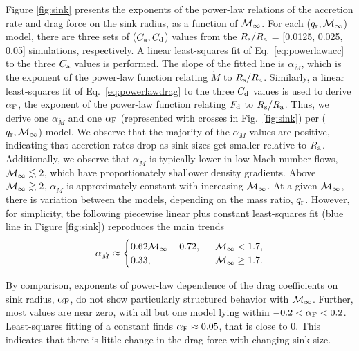 Figure \ref{fig:sink} presents the exponents of the power-law relations of the accretion rate and drag force on the sink radius, as a function of ${\cal M}_{\infty}$.  For each ($q_{\rm r}, \cal M_\infty$) model, there are three sets of ($C_{\rm a}, C_{\rm d}$) values from the $R_{\rm s}/R_{\rm a}$ = [0.0125, 0.025, 0.05] simulations, respectively. A linear least-squares fit of Eq.~\ref{eq:powerlawacc} to the three $C_{\rm a}$ values is performed. The slope of the fitted line is $\alpha_{\dot M}$, which is the exponent of the power-law function relating $\dot M$ to $R_{\rm s}/R_{\rm a}$. Similarly, a linear least-squares fit of Eq.~\ref{eq:powerlawdrag} to the three $C_{\rm d}$ values is used to derive $\alpha_{\rm F}$, the exponent of the power-law function relating $F_{\rm d}$ to $R_{\rm s}/R_{\rm a}$. Thus, we derive one $\alpha_{\dot M}$ and one $\alpha_{\rm F}$ (represented with crosses in Fig.~\ref{fig:sink}) per ($q_{\rm r}, \cal{M}_\infty$) model. We observe that the majority of the $\alpha_{\dot M}$ values are positive, indicating that accretion rates drop as sink sizes get smaller relative to $R_{\rm a}$. Additionally, we observe that $\alpha_{\dot M}$ is typically lower in low Mach number flows, ${\cal M}_\infty \lesssim 2$, which have proportionately shallower density gradients. Above  ${\cal M}_\infty \gtrsim 2$, $\alpha_{\dot M}$ is approximately constant with increasing ${\cal M}_\infty$. At a given ${\cal M}_\infty$, there is variation between the models, depending on the mass ratio, $q_{\rm r}$. However, for simplicity, the following piecewise linear plus constant least-squares fit (blue line in Figure \ref{fig:sink}) reproduces the main trends
\begin{equation}\label{eq:piecewise}
\alpha_{\dot M} \approx 
\begin{cases}
0.62 {\cal M}_\infty - 0.72,& \ \ {\cal M}_\infty < 1.7, \\
0.33,& \ \ {\cal M}_\infty \geq 1.7 .
\end{cases}
\end{equation}



By comparison, exponents of power-law dependence of the drag coefficients on sink radius, $\alpha_{\rm F}$, do not show particularly structured behavior with ${\cal M}_\infty$. Further, most values are near zero, with all but one model lying within $-0.2 < \alpha_{\rm F} < 0.2$. Least-squares fitting of a constant finds $\alpha_{\rm F} \approx 0.05$, that is close to 0. This indicates that there is little change in the drag force with changing sink size.

